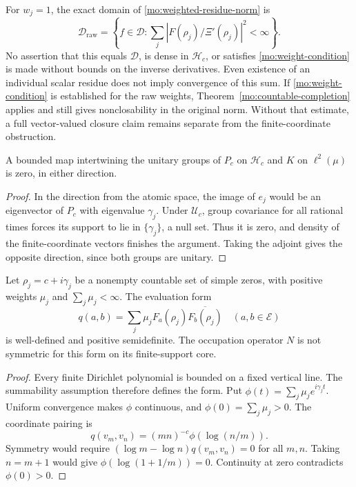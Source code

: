 For $w_j=1$, the exact domain of \eqref{mo:weighted-residue-norm}
is
\[
 \mathscr D_{\mathrm{raw}}=
 \left\{f\in\mathscr D:
 \sum_j|F(\rho_j)/\Xi'(\rho_j)|^2<\infty\right\}.
\]
No assertion that this equals $\mathscr D$, is dense in
$\mathscr H_c$, or satisfies \eqref{mo:weight-condition} is made
without bounds on the inverse derivatives. Even existence of an
individual scalar residue does not imply convergence of this sum.
If \eqref{mo:weight-condition} is established for the raw weights,
Theorem~\ref{mo:countable-completion} applies and still gives
nonclosability in the original norm. Without that estimate, a
full vector-valued closure claim remains separate from the
finite-coordinate obstruction.

\begin{proposition}
\label{mo:bounded-transfer}
A bounded map intertwining the unitary groups of $P_c$ on
$\mathscr H_c$ and $K$ on $\ell^2(\mu)$ is zero, in either
direction.
\end{proposition}
\begin{proof}
In the direction from the atomic space, the image of $e_j$ would
be an eigenvector of $P_c$ with eigenvalue $\gamma_j$.
Under $\mathcal U_c$, group covariance for all rational times
forces its support to lie in $\{\gamma_j\}$, a null set.
Thus it is zero, and density of the finite-coordinate vectors
finishes the argument. Taking the adjoint gives the opposite
direction, since both groups are unitary.
\end{proof}

\begin{proposition}
\label{mo:occupation-positive-obstruction}
Let $\rho_j=c+i\gamma_j$ be a nonempty countable set of simple
zeros, with positive weights $\mu_j$ and
$\sum_j\mu_j<\infty$. The evaluation form
\[
 q(a,b)=\sum_j\mu_jF_a(\rho_j)\overline{F_b(\rho_j)}
 \quad(a,b\in\mathscr E)
\]
is well-defined and positive semidefinite. The occupation operator
$N$ is not symmetric for this form on its finite-support core.
\end{proposition}
\begin{proof}
Every finite Dirichlet polynomial is bounded on a fixed vertical
line. The summability assumption therefore defines the form.
Put $\phi(t)=\sum_j\mu_je^{i\gamma_jt}$. Uniform convergence
makes $\phi$ continuous, and $\phi(0)=\sum_j\mu_j>0$.
The coordinate pairing is
\[
 q(v_m,v_n)=(mn)^{-c}\phi(\log(n/m)).
\]
Symmetry would require
$(\log m-\log n)q(v_m,v_n)=0$ for all $m,n$.
Taking $n=m+1$ would give
$\phi(\log(1+1/m))=0$. Continuity at zero contradicts
$\phi(0)>0$.
\end{proof}

